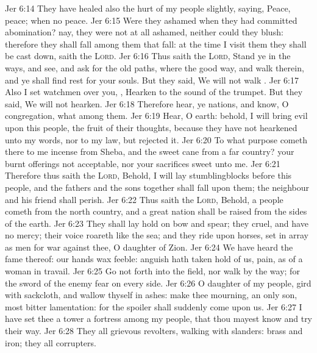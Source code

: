 \vs Jer 6:14 They have healed also the hurt  of my people slightly, saying, Peace, peace; when  no peace.
\vs Jer 6:15 Were they ashamed when they had committed abomination? nay, they were not at all ashamed, neither could they blush: therefore they shall fall among them that fall: at the time  I visit them they shall be cast down, saith the \textsc{Lord}.
\vs Jer 6:16 Thus saith the \textsc{Lord}, Stand ye in the ways, and see, and ask for the old paths, where  the good way, and walk therein, and ye shall find rest for your souls. But they said, We will not walk .
\vs Jer 6:17 Also I set watchmen over you, , Hearken to the sound of the trumpet. But they said, We will not hearken.
\vs Jer 6:18 Therefore hear, ye nations, and know, O congregation, what  among them.
\vs Jer 6:19 Hear, O earth: behold, I will bring evil upon this people,  the fruit of their thoughts, because they have not hearkened unto my words, nor to my law, but rejected it.
\vs Jer 6:20 To what purpose cometh there to me incense from Sheba, and the sweet cane from a far country? your burnt offerings  not acceptable, nor your sacrifices sweet unto me.
\vs Jer 6:21 Therefore thus saith the \textsc{Lord}, Behold, I will lay stumblingblocks before this people, and the fathers and the sons together shall fall upon them; the neighbour and his friend shall perish.
\vs Jer 6:22 Thus saith the \textsc{Lord}, Behold, a people cometh from the north country, and a great nation shall be raised from the sides of the earth.
\vs Jer 6:23 They shall lay hold on bow and spear; they  cruel, and have no mercy; their voice roareth like the sea; and they ride upon horses, set in array as men for war against thee, O daughter of Zion.
\vs Jer 6:24 We have heard the fame thereof: our hands wax feeble: anguish hath taken hold of us,  pain, as of a woman in travail.
\vs Jer 6:25 Go not forth into the field, nor walk by the way; for the sword of the enemy  fear  on every side.
\vs Jer 6:26 O daughter of my people, gird  with sackcloth, and wallow thyself in ashes: make thee mourning,  an only son, most bitter lamentation: for the spoiler shall suddenly come upon us.
\vs Jer 6:27 I have set thee  a tower  a fortress among my people, that thou mayest know and try their way.
\vs Jer 6:28 They  all grievous revolters, walking with slanders:  brass and iron; they  all corrupters.
